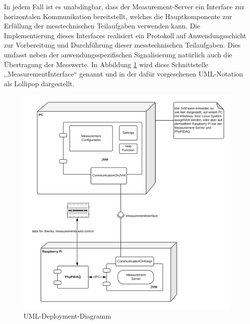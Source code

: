 \documentclass[parskip=full]{scrartcl}
\begin{document}
In jedem Fall ist es unabdingbar, dass der Measurement-Server ein Interface zur horizontalen Kommunikation bereitstellt, welches die Hauptkomponente zur Erfüllung der messtechnischen Teilaufgaben verwenden kann. Die Implementierung dieses Interfaces realisiert ein Protokoll auf Anwendungsschicht zur Vorbereitung und Durchführung dieser messtechnischen Teilaufgaben. Dies umfasst neben der anwendungsspezifischen Signalisierung natürlich auch die Übertragung der Messwerte. In Abbildung \ref{DeploymentDiagram} wird diese Schnittstelle ,,MeasurementInterface`` genannt und in der dafür vorgesehenen UML-Notation als Lollipop dargestellt. 


\begin{figure}[h]
	\begin{center}
		\includegraphics[width = 12cm]{Grafik/DeploymentDiagram.png}
		\caption{UML-Deployment-Diagramm}
		\label{DeploymentDiagram}
	\end{center}
\end{figure}
\end{document}
